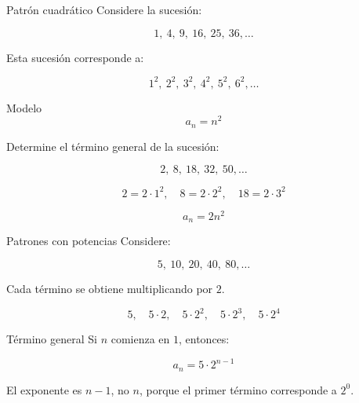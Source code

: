 \documentclass[handout,aspectratio=169]{beamer}
\begin{document}
	\begin{frame}{Patrón cuadrático}
		Considere la sucesión:
		
		\[
		1,\ 4,\ 9,\ 16,\ 25,\ 36,\ldots
		\]
		
		\pause
		
		Esta sucesión corresponde a:
		
		\[
		1^2,\ 2^2,\ 3^2,\ 4^2,\ 5^2,\ 6^2,\ldots
		\]
		
		\pause
		
		\begin{block}{Modelo}
			\[
			a_n=n^2
			\]
		\end{block}
		
		\pause
		
		\begin{actividad}
			Determine el término general de la sucesión:
			
			\[
			2,\ 8,\ 18,\ 32,\ 50,\ldots
			\]
		\end{actividad}
		
		\pause
		
		\[
		2=2\cdot1^2,\quad 8=2\cdot2^2,\quad 18=2\cdot3^2
		\]
		
		\[
		a_n=2n^2
		\]
	\end{frame}
	
	\begin{frame}{Patrones con potencias}
		Considere:
		
		\[
		5,\ 10,\ 20,\ 40,\ 80,\ldots
		\]
		
		\pause
		
		Cada término se obtiene multiplicando por \(2\).
		
		\pause
		
		\[
		5,\quad 5\cdot 2,\quad 5\cdot 2^2,\quad 5\cdot 2^3,\quad 5\cdot 2^4
		\]
		
		\pause
		
		\begin{block}{Término general}
			Si \(n\) comienza en \(1\), entonces:
			
			\[
			a_n=5\cdot 2^{n-1}
			\]
		\end{block}
		
		\pause
		
		\begin{alerta}
			El exponente es \(n-1\), no \(n\), porque el primer término corresponde a \(2^0\).
		\end{alerta}
	\end{frame}
	
\end{document}
